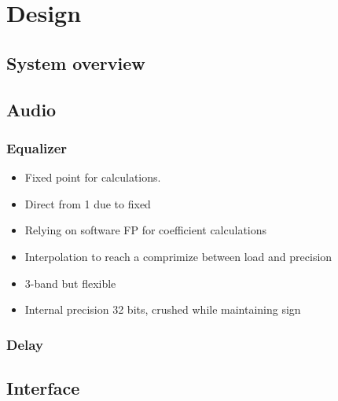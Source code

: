 \documentclass[12p]{article}
\begin{document}

\newpage
\section{Design}
\label{Design}
\subsection{System overview}
\label{Design:SystemOverview}

\subsection{Audio}
\label{Design:Audio}
\subsubsection{Equalizer}
\begin{itemize}
\item Fixed point for calculations.
\item Direct from 1 due to fixed
\item Relying on software FP for coefficient calculations
\item Interpolation to reach a comprimize between load and precision
\item 3-band but flexible
\item Internal precision 32 bits, crushed while maintaining sign
\end{itemize}
\subsubsection{Delay}

\subsection{Interface}
\label{Design:Interface}
\end{document}
